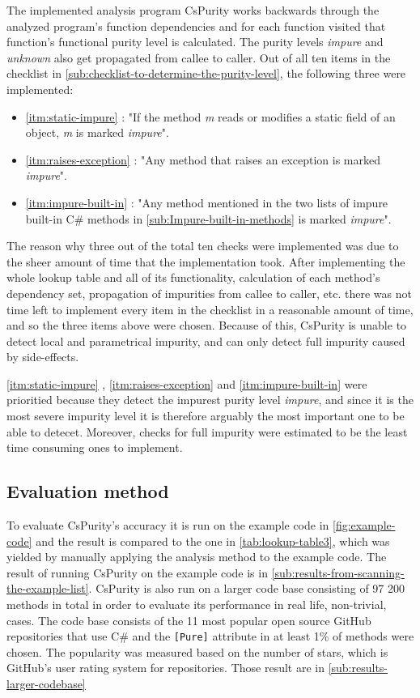 \documentclass[a4paper,12pt]{article}
\newcommand{\Autoref}[1]{%
  \begingroup%
  \def\chapterautorefname{Chapter}%
  \def\sectionautorefname{Section}%
  \def\subsectionautorefname{Subsection}%
  \def\itemautorefname{Item}%
  \autoref{#1}%
  \endgroup%
}
\begin{document}
The implemented analysis program CsPurity works backwards through the analyzed program's function dependencies and for each function visited that function's functional purity level is calculated. The purity levels \textit{impure} and \textit{unknown} also get propagated from callee to caller. Out of all ten items in the checklist in \autoref{sub:checklist-to-determine-the-purity-level}, the following three were implemented:

\begin{itemize}
  \item \Autoref{itm:static-impure}: "If the method \textit{m} reads or modifies a static field of an object, \textit{m} is marked \textit{impure}".
  \item \Autoref{itm:raises-exception}: "Any method that raises an exception is marked \textit{impure}".
  \item \Autoref{itm:impure-built-in}: "Any method mentioned in the two lists of impure built-in C\# methods in \autoref{sub:Impure-built-in-methods} is marked \textit{impure}".
\end{itemize}

The reason why three out of the total ten checks were implemented was due to the sheer amount of time that the implementation took. After implementing the whole lookup table and all of its functionality, calculation of each method's dependency set, propagation of impurities from callee to caller, etc. there was not time left to implement every item in the checklist in a reasonable amount of time, and so the three items above were chosen. Because of this, CsPurity is unable to detect local and parametrical impurity, and can only detect full impurity caused by side-effects.

\Autoref{itm:static-impure}, \ref{itm:raises-exception} and \ref{itm:impure-built-in} were prioritied because they detect the impurest purity level \textit{impure}, and since it is the most severe impurity level it is therefore arguably the most important one to be able to detecet. Moreover, checks for full impurity were estimated to be the least time consuming ones to implement.

\subsection{Evaluation method} \label{sub:evaluation-method}

To evaluate CsPurity's accuracy it is run on the example code in \autoref{fig:example-code} and the result is compared to the one in \autoref{tab:lookup-table3}, which was yielded by manually applying the analysis method to the example code. The result of running CsPurity on the example code is in \autoref{sub:results-from-scanning-the-example-list}. CsPurity is also run on a larger code base consisting of 97 200 methods in total in order to evaluate its performance in real life, non-trivial, cases. The code base consists of the 11 most popular open source GitHub repositories that use C\# and the \texttt{[Pure]} attribute in at least 1\% of methods were chosen. The popularity was measured based on the number of stars, which is GitHub's user rating system for repositories. Those result are in \autoref{sub:results-larger-codebase}
\end{document}
